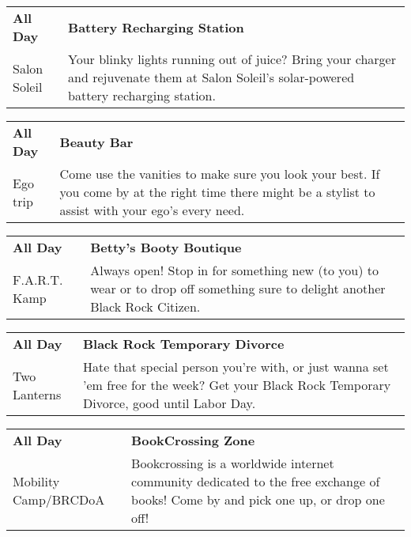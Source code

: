 \begin{tabular}{ p{1in} p{2.2in} }
    \textbf{All Day} & \textbf{Battery Recharging Station } \\
    Salon Soleil \newline  & Your blinky lights running out of juice? Bring your charger and rejuvenate them at Salon Soleil's solar-powered battery recharging station. \\
    \hline 
\end{tabular}
    
\begin{tabular}{ p{1in} p{2.2in} }
    \textbf{All Day} & \textbf{Beauty Bar} \\
    Ego trip \newline  & Come use the vanities to make sure you look your best. If you come by at the right time there might be a stylist to assist with your ego's every need. \\
    \hline 
\end{tabular}
    
\begin{tabular}{ p{1in} p{2.2in} }
    \textbf{All Day} & \textbf{Betty's Booty Boutique} \\
    F.A.R.T. Kamp \newline  & Always open! Stop in for something new (to you) to wear or to drop off something sure to delight another Black Rock Citizen. \\
    \hline 
\end{tabular}
    
\begin{tabular}{ p{1in} p{2.2in} }
    \textbf{All Day} & \textbf{Black Rock Temporary Divorce} \\
    Two Lanterns \newline  & Hate that special person you're with, or just wanna set 'em free for the
week? Get your Black Rock Temporary Divorce, good until Labor Day. \\
    \hline 
\end{tabular}
    
\begin{tabular}{ p{1in} p{2.2in} }
    \textbf{All Day} & \textbf{BookCrossing Zone} \\
    Mobility Camp/BRCDoA \newline  & Bookcrossing is a worldwide internet community dedicated to the free exchange of books! Come by and pick one up, or drop one off! \\
    \hline 
\end{tabular}
    
